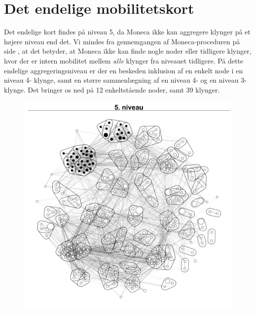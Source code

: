 
\section{Det endelige mobilitetskort \label{delanalyse1_endelige mobilitetskort}}

Det endelige kort findes på niveau 5, da Moneca ikke kan aggregere klynger på et højere niveau end det. Vi mindes fra gennemgangen af Moneca-proceduren på side  \pageref{metode_monecastepbystep}, at det betyder, at Moneca ikke kan finde nogle noder eller tidligere klynger, hvor der er intern mobilitet mellem  \emph{alle} klynger fra niveauet tidligere. %
På dette endelige aggregeringsniveau er der en beskeden inklusion af en enkelt node i en niveau 4- klynge, samt en større sammenlægning af en niveau 4- og en niveau 3-klynge. Det bringer os ned på 12 enkeltstående noder, samt 39 klynger. 

\begin{figure}[H]
\begin{centering}
  \includegraphics[width=10 cm]{fig/netvaerkskort/kort_seg_proces5.pdf}
  \label{fig_delanalyse1_kort_seg_proces5}
  \caption{}
\end{centering}
\end{figure}


